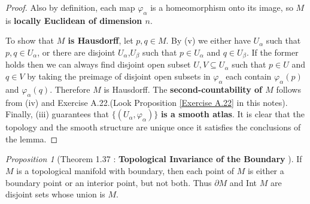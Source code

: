 \documentclass[a4paper]{article}
\theoremstyle{remark}
\newtheorem{prop}{Proposition}
\newcommand{\doo}{\partial}    %
\newcommand{\subhim}{\subseteq} %
\newcommand{\Ualpha}{U_{\alpha}} %
\newcommand{\Ubeta}{U_{\beta}} %
\newcommand{\VarphiAlpha}{\varphi_{\alpha}} %
\begin{document}
\begin{proof}
Also by definition, each map $\VarphiAlpha$ is a homeomorphism onto its image, so $M$ is \textbf{locally Euclidean of dimension $n$}.

To show that \textbf{$M$ is Hausdorff}, let $p,q \in M$. By (v) we either have $\Ualpha$ such that $p,q \in \Ualpha$, or there are disjoint $\Ualpha$,$\Ubeta$ such that $p \in \Ualpha$ and $q \in \Ubeta$. If the former holds then we can always find disjoint open subset $U,V \subhim \Ualpha$ such that $p\in U$ and $q \in V$ by taking the preimage of disjoint open subsets in $\VarphiAlpha$ each contain $\VarphiAlpha(p)$ and $\VarphiAlpha(q)$. Therefore $M$  is Hausdorff. The \textbf{second-countability of $M$} follows from (iv) and Exercise A.22.(Look Proposition \ref{Exercise A.22} in this notes). Finally, (iii) guarantees that $\{(\Ualpha,\VarphiAlpha)\}$ \textbf{is a smooth atlas}. It is clear that the topology and the smooth structure are unique once it satisfies the conclusions of the lemma.
\end{proof}

\begin{prop}[Theorem 1.37 : \textbf{Topological Invariance of the Boundary} \cite{LeeSM}]
If $M$ is a topological manifold with boundary, then each point of $M$ is either a boundary point or an interior point, but not both. Thus $\doo M$ and Int $M$ are disjoint sets whose union is $M$.
\end{prop}
\end{document}
